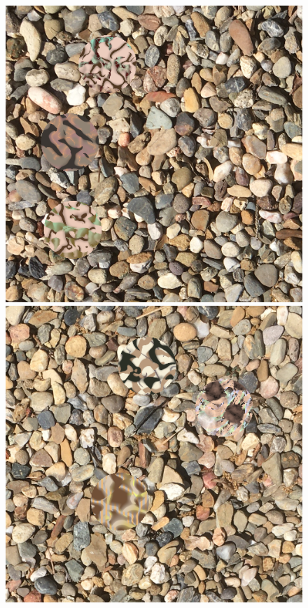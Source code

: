 \documentclass[acmtog]{acmart}
\begin{document}
\begin{figure}
    \includegraphics[scale=0.24]{20221215_step_5867.png}
    \hfill
    \includegraphics[scale=0.24]{20221215_step_5892.png}

\end{figure}
\end{document}
